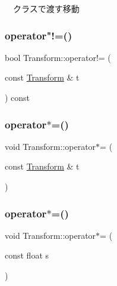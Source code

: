 　クラスで渡す移動 

\mbox{\label{class_transform_ae0aed78dcd6aaeb786ec0bdadafa9498}} 
\subsubsection{\texorpdfstring{operator"!=()}{operator!=()}}
{\footnotesize\ttfamily bool Transform\+::operator!= (\begin{DoxyParamCaption}\item[{const \mbox{\hyperlink{class_transform}{Transform}} \&}]{t }\end{DoxyParamCaption}) const}

\mbox{\label{class_transform_a3746d6759ca289e8cd4982e889e7ec6b}} 
\subsubsection{\texorpdfstring{operator$\ast$=()}{operator*=()}\hspace{0.1cm}{\footnotesize\ttfamily [1/2]}}
{\footnotesize\ttfamily void Transform\+::operator$\ast$= (\begin{DoxyParamCaption}\item[{const \mbox{\hyperlink{class_transform}{Transform}} \&}]{t }\end{DoxyParamCaption})}

\mbox{\label{class_transform_ab13378f63abf5bc132841f83423a634d}} 
\subsubsection{\texorpdfstring{operator$\ast$=()}{operator*=()}\hspace{0.1cm}{\footnotesize\ttfamily [2/2]}}
{\footnotesize\ttfamily void Transform\+::operator$\ast$= (\begin{DoxyParamCaption}\item[{const float}]{s }\end{DoxyParamCaption})}

